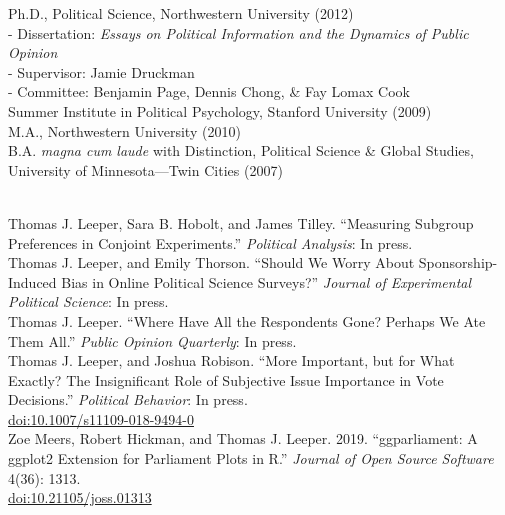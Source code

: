 \documentclass[12pt]{article}
\renewcommand{\section}[1]{\pagebreak[3]%
    \llap{\scshape\smash{\parbox[t]{\marginparwidth}{\raggedright {\color{lg}#1}}}}%
    \vspace{-\baselineskip}\par}
\newcommand{\topic}[1]{\pagebreak[3]\indent {\color{lg}{\footnotesize #1 }}\\}
\newcommand{\entry}[1]{\indent {\color{lg}\guillemotright}\hspace{2pt}#1\vspace{.25em}\\}
\newcommand{\subentry}[1]{{\color{lg}-} #1\vspace{.25em}\\}
\begin{document}
\section{Education}
\entry{Ph.D., Political Science, Northwestern University (2012)}
	\subentry{Dissertation: \textit{Essays on Political Information and the Dynamics of Public Opinion}}
	\subentry{Supervisor: Jamie Druckman}
	\subentry{Committee: Benjamin Page, Dennis Chong, \& Fay Lomax Cook}
\entry{Summer Institute in Political Psychology, Stanford University (2009)}
\entry{M.A., Northwestern University (2010)}
\entry{B.A. \textit{magna cum laude} with Distinction, Political Science \& Global Studies, University of Minnesota---Twin Cities (2007)}

\section{Publications}
\topic{Peer-Reviewed Publications: 2019}
    \entry{Thomas J. Leeper, Sara B. Hobolt, and James Tilley. ``Measuring Subgroup Preferences in Conjoint Experiments.'' \textit{Political Analysis}: In press.}
    \entry{Thomas J. Leeper, and Emily Thorson. ``Should We Worry About Sponsorship-Induced Bias in Online Political Science Surveys?'' \textit{Journal of Experimental Political Science}: In press.}
    \entry{Thomas J. Leeper. ``Where Have All the Respondents Gone? Perhaps We Ate Them All.'' \textit{Public Opinion Quarterly}: In press.}
    \entry{Thomas J. Leeper, and Joshua Robison. ``More Important, but for What Exactly? The Insignificant Role of Subjective Issue Importance in Vote Decisions.'' \textit{Political Behavior}: In press.\\ \href{https://doi.org/10.1007/s11109-018-9494-0}{doi:10.1007/s11109-018-9494-0}}
    \entry{Zoe Meers, Robert Hickman, and Thomas J. Leeper. 2019. ``ggparliament: A ggplot2 Extension for Parliament Plots in R.'' \textit{Journal of Open Source Software} 4(36): 1313.\\ \href{https://doi.org/10.21105/joss.01313}{doi:10.21105/joss.01313}}
\end{document}
